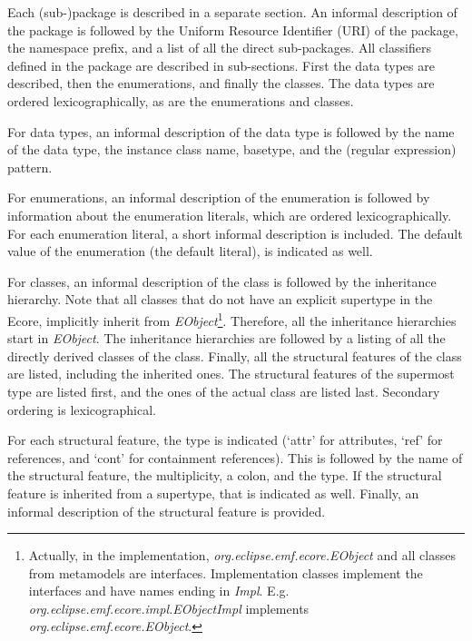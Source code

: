 
Each (sub-)package is described in a separate section. An informal description
of the package is followed by the Uniform Resource Identifier (URI) of the
package, the namespace prefix, and a list of all the direct sub-packages. All
classifiers defined in the package are described in sub-sections. First the
data types are described, then the enumerations, and finally the classes. The
data types are ordered lexicographically, as are the enumerations and classes.

For data types, an informal description of the data type is followed by the
name of the data type, the instance class name, basetype, and the (regular
expression) pattern.

For enumerations, an informal description of the enumeration is followed by
information about the enumeration literals, which are ordered
lexicographically. For each enumeration literal, a short informal description
is included. The default value of the enumeration (the default literal), is
indicated as well.

For classes, an informal description of the class is followed by the
inheritance hierarchy. Note that all classes that do not have an explicit
supertype in the Ecore, implicitly inherit from
\emph{EObject}\footnote{Actually, in the implementation,
\emph{org.eclipse.emf.ecore.EObject} and all classes from metamodels are
interfaces. Implementation classes implement the interfaces and have names
ending in \emph{Impl}. E.g. \emph{org.eclipse.emf.ecore.impl.EObjectImpl}
implements \emph{org.eclipse.emf.ecore.EObject}.}. Therefore, all the
inheritance hierarchies start in \emph{EObject}. The inheritance hierarchies
are followed by a listing of all the directly derived classes of the class.
Finally, all the structural features of the class are listed, including the
inherited ones. The structural features of the supermost type are listed
first, and the ones of the actual class are listed last. Secondary ordering
is lexicographical.

For each structural feature, the type is indicated (`attr' for attributes,
`ref' for references, and `cont' for containment references). This is followed
by the name of the structural feature, the multiplicity, a colon, and the
type. If the structural feature is inherited from a supertype, that is
indicated as well. Finally, an informal description of the structural feature
is provided.
